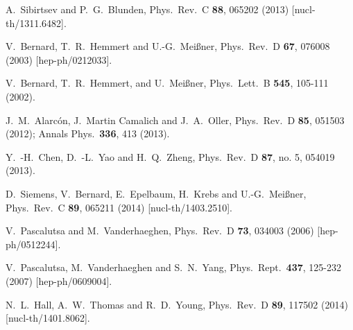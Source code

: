 \documentclass[twocolumn,prc,showpacs,nofootinbib,preprintnumbers,amsmath,amssymb,superscriptaddress]{revtex4-1}
\begin{document}
\begin{thebibliography}{99}
  A.~Sibirtsev and P.~G.~Blunden,
Phys.\ Rev.\ C {\bf 88}, 065202 (2013) [nucl-th/1311.6482].



  V.~Bernard, T.~R.~Hemmert and U.-G.~Mei\ss ner,
  Phys.\ Rev.\ D {\bf 67}, 076008 (2003)
  [hep-ph/0212033].

V.~Bernard, T.~R.~Hemmert, and U.~Mei\ss ner,
Phys.\ Lett.\ B {\bf 545}, 105-111 (2002).


  J.~M.~Alarc\'on, J.~Martin Camalich and J.~A.~Oller,
    Phys.\ Rev.\ D {\bf 85}, 051503 (2012);  Annals Phys.\  {\bf 336}, 413 (2013).
  
  
  Y.~-H.~Chen, D.~-L.~Yao and H.~Q.~Zheng,
  Phys.\ Rev.\ D {\bf 87}, no. 5, 054019 (2013).

  D.~Siemens, V.~Bernard, E.~Epelbaum, H.~Krebs and U.-G.~Mei\ss ner,
 Phys.\ Rev.\ C {\bf 89}, 065211 (2014) [nucl-th/1403.2510].

  
  
  V.~Pascalutsa and M.~Vanderhaeghen,
  Phys.\ Rev.\ D {\bf 73}, 034003 (2006)
  [hep-ph/0512244].
  
  
  V.~Pascalutsa, M.~Vanderhaeghen and S.~N.~Yang,
   Phys.\ Rept.\ {\bf 437}, 125-232 (2007)
   [hep-ph/0609004].
  
  N.~L.~Hall, A.~W.~Thomas and R.~D.~Young,
Phys.\ Rev.\ D {\bf 89}, 117502 (2014)  [nucl-th/1401.8062].


\end{thebibliography}
\end{document}
